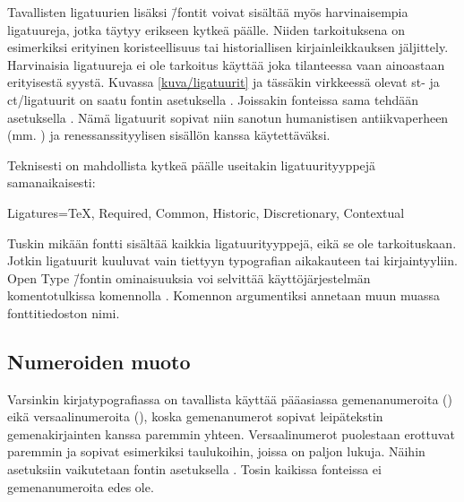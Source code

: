 \noindent
Tavallisten ligatuurien lisäksi  \=/fontit voivat
sisältää myös harvinaisempia ligatuureja, jotka täytyy erikseen kytkeä
päälle. Niiden tarkoituksena on esimerkiksi erityinen koristeellisuus
tai historiallisen kirjainleikkauksen jäljittely. Harvinaisia
ligatuureja ei ole tarkoitus käyttää joka tilanteessa vaan ainoastaan
erityisestä syystä. Kuvassa \ref{kuva/ligatuurit} ja tässäkin virkkeessä
olevat {%
  \newcommand{\hlig}[1]{{#1}}%
  \hlig{st}- ja \hlig{ct}\-/ligatuurit%
} on saatu fontin asetuksella .
Joissakin fonteissa sama tehdään asetuksella . Nämä ligatuurit sopivat niin sanotun humanistisen
antiikvaperheen (mm. ) ja renessanssityylisen
sisällön kanssa käytettäväksi.

Teknisesti on mahdollista kytkeä päälle useitakin ligatuurityyppejä
samanaikaisesti:

\begin{koodilohkosis}
Ligatures={TeX, Required, Common, Historic, Discretionary,
  Contextual}
\end{koodilohkosis}

\noindent
Tuskin mikään fontti sisältää kaikkia ligatuurityyppejä, eikä se ole
tarkoituskaan. Jotkin ligatuurit kuuluvat vain tiettyyn typografian
aikakauteen tai kirjaintyyliin. Open Type \=/fontin ominaisuuksia voi
selvittää käyttöjärjestelmän komentotulkissa komennolla .
Komennon argumentiksi annetaan muun muassa fonttitiedoston nimi.


\subsection{Numeroiden muoto}
\label{luku/fontit-numerot}

Varsinkin kirjatypografiassa on tavallista käyttää pääasiassa
gemenanumeroita ({}) eikä versaalinumeroita
({}), koska gemenanumerot sopivat leipätekstin
gemenakirjainten kanssa paremmin yhteen. Versaalinumerot puolestaan
erottuvat paremmin ja sopivat esimerkiksi taulukoihin, joissa on paljon
lukuja. Näihin asetuksiin vaikutetaan fontin asetuksella
. Tosin kaikissa fonteissa ei gemenanumeroita edes ole.

